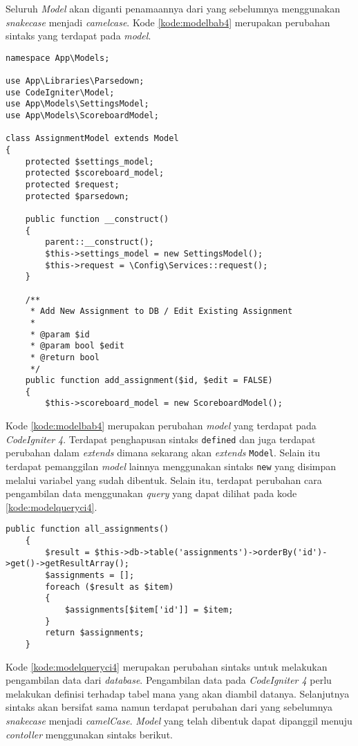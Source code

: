 Seluruh \textit{Model} akan diganti penamaannya dari yang sebelumnya menggunakan \textit{snakecase} menjadi \textit{camelcase}. Kode \ref{kode:modelbab4} merupakan perubahan sintaks yang terdapat pada \textit{model}.

\begin{lstlisting}[caption=Perancangan perubahan \textit{model} pada \textit{CodeIgniter 4}, label=kode:modelbab4]
namespace App\Models;

use App\Libraries\Parsedown;
use CodeIgniter\Model;
use App\Models\SettingsModel;
use App\Models\ScoreboardModel;

class AssignmentModel extends Model
{
	protected $settings_model;
	protected $scoreboard_model;
	protected $request;
	protected $parsedown;

	public function __construct()
	{
		parent::__construct();
		$this->settings_model = new SettingsModel();
		$this->request = \Config\Services::request(); 
	}

	/**
	 * Add New Assignment to DB / Edit Existing Assignment
	 *
	 * @param $id
	 * @param bool $edit
	 * @return bool
	 */
	public function add_assignment($id, $edit = FALSE)
	{	
		$this->scoreboard_model = new ScoreboardModel();
\end{lstlisting}

Kode \ref{kode:modelbab4} merupakan perubahan \textit{model} yang terdapat pada \textit{CodeIgniter 4}. Terdapat penghapusan sintaks \texttt{defined} dan juga terdapat perubahan dalam \textit{extends} dimana sekarang akan \textit{extends} \texttt{Model}. Selain itu terdapat pemanggilan \textit{model} lainnya menggunakan sintaks \texttt{new} yang disimpan melalui variabel yang sudah dibentuk. Selain itu, terdapat perubahan cara pengambilan data menggunakan \textit{query} yang dapat dilihat pada kode \ref{kode:modelqueryci4}.

\begin{lstlisting}[caption=Perubahan sintaks pada \textit{model}, label=kode:modelqueryci4]
	public function all_assignments()
	{
		$result = $this->db->table('assignments')->orderBy('id')->get()->getResultArray();
		$assignments = [];
		foreach ($result as $item)
		{
			$assignments[$item['id']] = $item;
		}
		return $assignments;
	}
\end{lstlisting}

Kode \ref{kode:modelqueryci4} merupakan perubahan sintaks untuk melakukan pengambilan data dari \textit{database}. Pengambilan data pada \textit{CodeIgniter 4} perlu melakukan definisi terhadap tabel mana yang akan diambil datanya. Selanjutnya sintaks akan bersifat sama namun terdapat perubahan dari yang sebelumnya \textit{snakecase} menjadi \textit{camelCase}. \textit{Model} yang telah dibentuk dapat dipanggil menuju \textit{contoller} menggunakan sintaks berikut.


